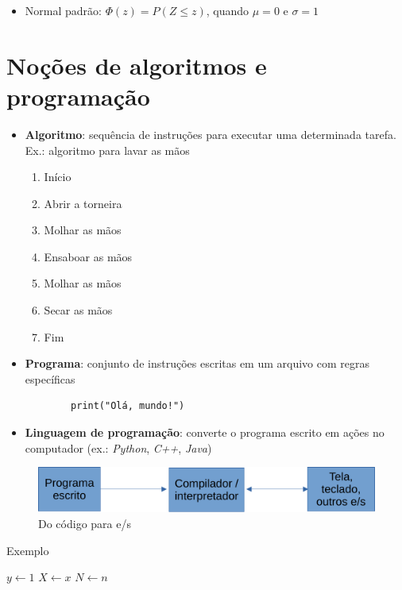 \begin{itemize}
	\item Normal padrão: $\Phi(z)=P(Z\leq z)$, quando $\mu=0$ e $\sigma=1$
\end{itemize}


\section{Noções de algoritmos e programação}\label{sec:algoritmo}
\begin{itemize}
	\item \textbf{Algoritmo}: sequência de instruções para executar uma determinada tarefa. Ex.: algoritmo para lavar as mãos
	\begin{enumerate}
		\centering
		\item Início
		\item Abrir a torneira
		\item Molhar as mãos
		\item Ensaboar as mãos
		\item Molhar as mãos
		\item Secar as mãos
		\item Fim
	\end{enumerate}
	
	\item \textbf{Programa}: conjunto de instruções escritas em um arquivo com regras específicas
	\begin{verbatim}
		print("Olá, mundo!")
	\end{verbatim}
	\item \textbf{Linguagem de programação}: converte o programa escrito em ações no computador (ex.: \textit{Python}, \textit{C++}, \textit{Java})
\end{itemize}

\begin{figure}[htb!]
	\centering
	\caption{Do código para e/s}
	\label{fig:codigoio}
	\includegraphics[width=0.7\linewidth]{figs/codigo_io}
\end{figure}

\begin{algorithm}
	\caption{Exemplo}\label{alg:ohm}
	$y \gets 1$\;
	$X \gets x$\;
	$N \gets n$\;
\end{algorithm}
